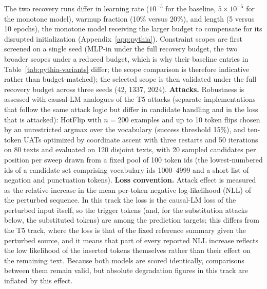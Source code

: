 \documentclass{article}
\theoremstyle{plain}
\theoremstyle{definition}
\theoremstyle{remark}
\begin{document}
The two recovery runs differ in learning rate ($10^{-5}$ for the baseline, $5\times 10^{-5}$ for the monotone model), warmup fraction (10\% versus 20\%), and length (5 versus 10 epochs), the monotone model receiving the larger budget to compensate for its disrupted initialization (Appendix~\ref{app:pythia}). Constraint scopes are first screened on a single seed (MLP-in under the full recovery budget, the two broader scopes under a reduced budget, which is why their baseline entries in Table~\ref{tab:pythia-variants} differ; the scope comparison is therefore indicative rather than budget-matched); the selected scope is then validated under the full recovery budget across three seeds (42, 1337, 2024). %
\textbf{Attacks.} Robustness is assessed with causal-LM analogues of the T5 attacks (separate implementations that follow the same attack logic but differ in candidate handling and in the loss that is attacked): HotFlip with $n = 200$ examples and up to 10 token flips chosen by an unrestricted argmax over the vocabulary (success threshold 15\%), and ten-token UATs optimized by coordinate ascent with three restarts and 50 iterations on 80 texts and evaluated on 120 disjoint texts, with 20 sampled candidates per position per sweep drawn from a fixed pool of 100 token ids (the lowest-numbered ids of a candidate set comprising vocabulary ids 1000--4999 and a short list of negation and punctuation tokens). %
\textbf{Loss convention.} Attack effect is measured as the relative increase in the mean per-token negative log-likelihood (NLL) of the perturbed sequence. %
In this track the loss is the causal-LM loss of the perturbed input itself, so the trigger tokens (and, for the substitution attacks below, the substituted tokens) are among the prediction targets; this differs from the T5 track, where the loss is that of the fixed reference summary given the perturbed source, and it means that part of every reported NLL increase reflects the low likelihood of the inserted tokens themselves rather than their effect on the remaining text. Because both models are scored identically, comparisons between them remain valid, but absolute degradation figures in this track are inflated by this effect.
\end{document}
